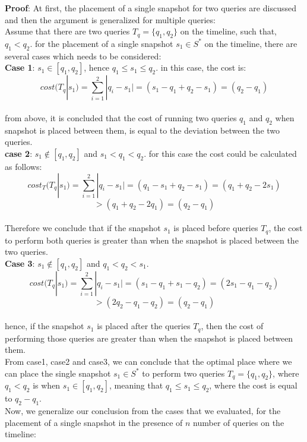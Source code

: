 \textbf{Proof}:
At first, the placement of a single snapshot for two queries are discussed and then the argument is generalized for multiple queries:\\
Assume that there are two queries $T_q=\{q_1,q_2\}$ on the timeline, such that, $q_1<q_2$. for the placement of a single snapshot $s_1 \in S^*$ on the timeline, there are several cases which needs to be considered:\\
\textbf{Case 1}:
$s_1 \in [q_1,q_2]$, hence $q_1\leq s_1\leq q_2$.
in this case, the cost is:\\
$$cost(T_q|s_1)=\sum_{i=1}^2|q_i-s_1| = (s_1-q_1+q_2-s_1)=(q_2-q_1)$$\\
from above, it is concluded that the cost of running two queries $q_1$ and $q_2$ when snapshot is placed between them, is equal to the deviation between the two queries.\\
\textbf{case 2}:
$s_1 \notin [q_1,q_2]$ and $s_1 < q_1 < q_2$. for this case the cost could be calculated as follows:
$$cost_T(T_q|s_1)=\sum_{i=1}^2|q_i-s_1| = (q_1-s_1+q_2-s_1)=(q_1+q_2-2s_1) $$$$>(q_1+q_2-2q_1)=(q_2-q_1)$$\\
Therefore we conclude that if the snapshot $s_1$ is placed before queries $T_q$, the cost to perform both queries is greater than when the snapshot is placed between the two queries.\\
\textbf{Case 3}:
$s_1 \notin [q_1,q_2]$ and $q_1 < q_2 < s_1$.
$$cost(T_q|s_1)=\sum_{i=1}^2|q_i-s_1| = (s_1-q_1+s_1-q_2)=(2s_1-q_1-q_2) $$$$>(2q_2-q_1-q_2)=(q_2-q_1)$$\\
hence, if the snapshot $s_1$ is placed after the queries $T_q$, then the cost of performing those queries are greater than when the snapshot is placed between them.\\
From case1, case2 and case3, we can conclude that the optimal place where we can place the single snapshot $s_1 \in S^*$ to perform two queries $T_q = \{q_1,q_2\}$, where $q_1<q_2$ is when $s_1 \in [q_1,q_2]$, meaning that $q_1 \leq s_1 \leq q_2$, where the cost is equal to $q_2-q_1$.\\

Now, we generalize our conclusion from the cases that we evaluated, for the placement of a single snapshot in the presence of $n$ number of queries on the timeline: 


